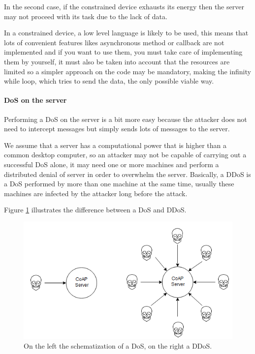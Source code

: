 	In the second case, if the constrained device exhausts its energy then the server may not proceed with its task due to the lack of data.\newline
	
	In a constrained device, a low level language is likely to be used, this means that lots of convenient features likes asynchronous method or callback are not implemented and if you want to use them, you must take care of implementing them by yourself, it must also be taken into account that the resources are limited so a simpler approach on the code may be mandatory, making the infinity while loop, which tries to send the data, the only possible viable way.\newline
	
	\paragraph{DoS on the server}
	Performing a DoS on the server is a bit more easy because the attacker does not need to intercept messages but simply sends lots of messages to the server.\newline
	
	We assume that a server has a computational power that is higher than a common desktop computer, so an attacker may not be capable of carrying out a successful DoS alone, it may need one or more machines and perform a distributed denial of server in order to overwhelm the server.\newline
	Basically, a DDoS is a DoS performed by more than one machine at the same time, usually these machines are infected by the attacker long before the attack.\newline
	
	Figure \ref{fig:coap-vuln1} illustrates the difference between a DoS and DDoS.
	
	\begin{figure}
		\includegraphics[width=\linewidth]{coap-vuln-img1.png}
		\caption{On the left the schematization of a DoS, on the right a DDoS.}
		\label{fig:coap-vuln1}
	\end{figure}

